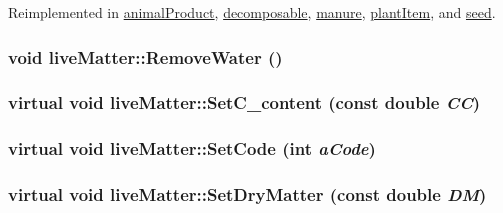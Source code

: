 Reimplemented in \hyperlink{classanimal_product_a5fb92897386b34edf51415f88806dd03}{animalProduct}, \hyperlink{classdecomposable_a79e5c1092b6c8f3e9f233a26ed308c63}{decomposable}, \hyperlink{classmanure_a0bf5e3b02282ec2a7d265e04e2c3f561}{manure}, \hyperlink{classplant_item_a6ed5a9408b471bb44246e5c50e93b72f}{plantItem}, and \hyperlink{classseed_a8212329dfb9f4a2bc4c8a0fe401efaf3}{seed}.\hypertarget{classlive_matter_ad058ede27a28aa89754500d5ccbbdd8a}{
\subsubsection[{RemoveWater}]{\setlength{\rightskip}{0pt plus 5cm}void liveMatter::RemoveWater ()}}
\label{classlive_matter_ad058ede27a28aa89754500d5ccbbdd8a}
\hypertarget{classlive_matter_ac85d49a99a56f9f3e47822ebaf54cbaf}{
\subsubsection[{SetC\_\-content}]{\setlength{\rightskip}{0pt plus 5cm}virtual void liveMatter::SetC\_\-content (const double {\em CC})}}
\label{classlive_matter_ac85d49a99a56f9f3e47822ebaf54cbaf}
\hypertarget{classlive_matter_adccc136d61343a2fa73a7ed5aafbed3e}{
\subsubsection[{SetCode}]{\setlength{\rightskip}{0pt plus 5cm}virtual void liveMatter::SetCode (int {\em aCode})}}
\label{classlive_matter_adccc136d61343a2fa73a7ed5aafbed3e}
\hypertarget{classlive_matter_aee8cb3a1d73625321b1b73dd285dffb4}{
\subsubsection[{SetDryMatter}]{\setlength{\rightskip}{0pt plus 5cm}virtual void liveMatter::SetDryMatter (const double {\em DM})}}
